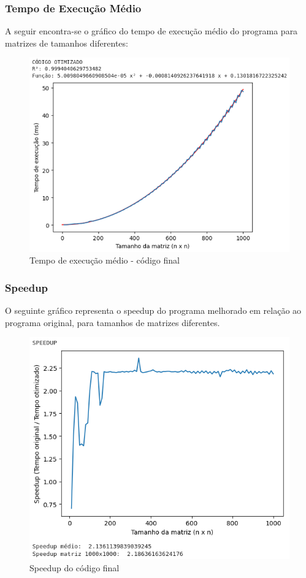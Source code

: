 \subsubsection{\esp Tempo de Execução Médio}
A seguir encontra-se o gráfico do tempo de execução médio do programa para matrizes de tamanhos diferentes: 

\begin{figure}[!ht]
	\centering	
	\caption[\hspace{0.1cm}Tempo de execução médio - código final]{Tempo de execução médio - código final}
	  \vspace{-0.4cm}
	\includegraphics[width=.8\textwidth]{figuras/otimizado.png}
\end{figure}

\subsubsection{\esp Speedup}
O seguinte gráfico representa o speedup do programa melhorado em relação ao programa original, para tamanhos de matrizes diferentes.

\begin{figure}[!ht]
	\centering	
	\caption[\hspace{0.1cm}Speedup do código final]{Speedup do código final}
	  \vspace{-0.4cm}
	\includegraphics[width=.8\textwidth]{figuras/speedup_otimizado.png}
\end{figure}

